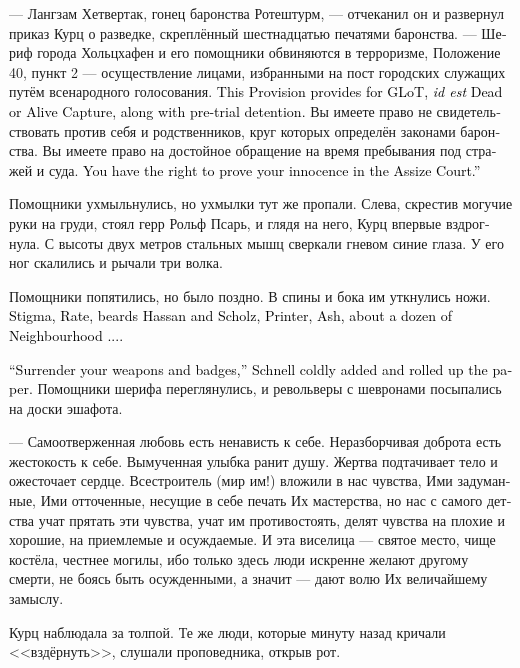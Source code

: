\documentclass[a4paper,12pt,fleqn]{book}\usepackage{cooltooltips}\usepackage{polyglossia}\setdefaultlanguage[babelshorthands=true]{russian}\setotherlanguage{english}\defaultfontfeatures{Ligatures=TeX,Mapping=tex-text} \usepackage{xcolor}\definecolor{lightgray}{HTML}{bbbbbb}\color{lightgray}\newcommand{\ml}[3]{\textenglish{\textcolor{black}{#3}}}
\newcommand{\textspace}{\vspace{1em}{\centering\Large\bfseries<...>\par}\vspace{1em}}
\begin{document}
--- Лангзам Хетвертак, гонец баронства Ротештурм, --- отчеканил он и развернул приказ Курц о разведке, скреплённый шестнадцатью печатями баронства.
--- Шериф города Хольцхафен и его помощники обвиняются в терроризме, Положение 40, пункт 2 --- осуществление лицами, избранными на пост городских служащих путём всенародного голосования.
\ml{$0$}
{Положение предусматривает ГЛоТ, то есть взятие живыми или мёртвыми, а также удержание под стражей до суда.}
{This Provision provides for GLoT, \textit{id est} Dead or Alive Capture, along with pre-trial detention.}
Вы имеете право не свидетельствовать против себя и родственников, круг которых определён законами баронства.
Вы имеете право на достойное обращение на время пребывания под стражей и суда.
\ml{$0$}
{Вы имеете право доказывать свою невиновность в суде присяжных.}
{You have the right to prove your innocence in the Assize Court.''}

Помощники ухмыльнулись, но ухмылки тут же пропали.
Слева, скрестив могучие руки на груди, стоял герр Рольф Псарь, и глядя на него, Курц впервые вздрогнула.
С высоты двух метров стальных мышц сверкали гневом синие глаза.
У его ног скалились и рычали три волка.

Помощники попятились, но было поздно.
В спины и бока им уткнулись ножи.
\ml{$0$}
{Стигма, Рате, бородачи Хассан и Шольц, Типограф, Ясень, ещё с десяток членов Соседства...}
{Stigma, Rate, beards Hassan and Scholz, Printer, Ash, about a dozen of Neighbourhood ....}

\ml{$0$}
{--- Сдайте оружие и значки, --- сухо добавил Шнелль, свернув приказ в трубочку.}
{``Surrender your weapons and badges,'' Schnell coldly added and rolled up the paper.}
Помощники шерифа переглянулись, и револьверы с шевронами посыпались на доски эшафота.

\textspace

--- Самоотверженная любовь есть ненависть к себе.
Неразборчивая доброта есть жестокость к себе.
Вымученная улыбка ранит душу.
Жертва подтачивает тело и ожесточает сердце.
Всестроитель (мир им!) вложили в нас чувства, Ими задуманные, Ими отточенные, несущие в себе печать Их мастерства, но нас с самого детства учат прятать эти чувства, учат им противостоять, делят чувства на плохие и хорошие, на приемлемые и осуждаемые.
И эта виселица --- святое место, чище костёла, честнее могилы, ибо только здесь люди искренне желают другому смерти, не боясь быть осужденными, а значит --- дают волю Их величайшему замыслу.

Курц наблюдала за толпой.
Те же люди, которые минуту назад кричали <<вздёрнуть>>, слушали проповедника, открыв рот.
\end{document}
